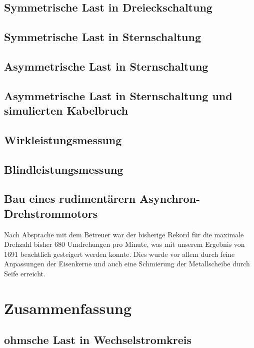 \documentclass[12pt,english,ngerman]{scrartcl}
\begin{document}
\subsection{Symmetrische Last in Dreieckschaltung}

\subsection{Symmetrische Last in Sternschaltung}

\subsection{Asymmetrische Last in Sternschaltung}

\subsection{Asymmetrische Last in Sternschaltung und simulierten Kabelbruch}

\subsection{Wirkleistungsmessung}

\subsection{Blindleistungsmessung}

\subsection{Bau eines rudimentärern Asynchron-Drehstrommotors}

Nach Absprache mit dem Betreuer war der bisherige Rekord für die maximale
Drehzahl bisher 680 Umdrehungen pro Minute, was mit unserem Ergebnis von 1691
beachtlich gesteigert werden konnte. Dies wurde vor allem durch feine
Anpassungen der Eisenkerne und auch eine Schmierung der Metallscheibe durch
Seife erreicht.

\section{Zusammenfassung}\label{sec:zusammenfassung}

\subsection{ohmsche Last in Wechselstromkreis}
\end{document}
